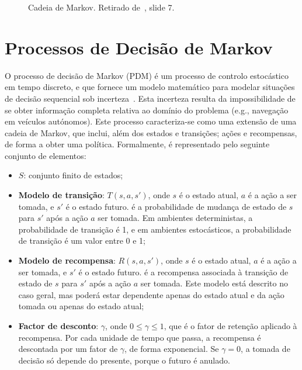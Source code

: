 \begin{figure}[H]
    \begin{center}
    \end{center}
    \caption{Cadeia de Markov.
    Retirado de~\cite{isel:iasa:slides:processos-decisao-sequencial}, slide 7.}
    \label{fig:cadeia-de-markov}
\end{figure}


\section{Processos de Decisão de Markov}\label{sec:processos-de-decisao-de-markov}

O processo de decisão de Markov (PDM) é um processo de controlo estocástico em tempo discreto, e que fornece um modelo matemático para modelar situações de decisão sequencial sob incerteza~\cite{wiki:markov-decision-process}.
Esta incerteza resulta da impossibilidade de se obter informação completa relativa ao domínio do problema (e.g., navegação em veículos autónomos).
Este processo caracteriza-se como uma extensão de uma cadeia de Markov, que inclui, além dos estados e transições; ações e recompensas, de forma a obter uma política.
Formalmente, é representado pelo seguinte conjunto de elementos:

\begin{itemize}
    \item \textbf{$S$}: conjunto finito de estados;
    \item \textbf{Modelo de transição}: \( T(s, a, s') \), onde \( s \) é o estado atual, \( a \) é a ação a ser tomada, e \( s' \) é o estado futuro.
    é a probabilidade de mudança de estado de \( s \) para \( s' \) após a ação \( a \) ser tomada.
    Em ambientes deterministas, a probabilidade de transição é 1, e em ambientes estocásticos, a probabilidade de transição é um valor entre 0 e 1;
    \item \textbf{Modelo de recompensa}: \( R(s, a, s') \), onde \( s \) é o estado atual, \( a \) é a ação a ser tomada, e \( s' \) é o estado futuro.
    é a recompensa associada à transição de estado de \( s \) para \( s' \) após a ação \( a \) ser tomada.
    Este modelo está descrito no caso geral, mas poderá estar dependente apenas do estado atual e da ação tomada ou apenas do estado atual;
    \item \textbf{Factor de desconto}: \( \gamma \), onde \( 0 \leq \gamma \leq 1 \), que é o fator de retenção aplicado à recompensa.
    Por cada unidade de tempo que passa, a recompensa é descontada por um fator de \( \gamma \), de forma exponencial.
    Se \( \gamma = 0 \), a tomada de decisão só depende do presente, porque o futuro é anulado.
\end{itemize}

